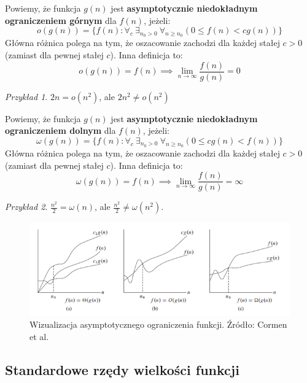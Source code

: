 \documentclass[10pt, oneside]{article}
\theoremstyle{remark}
\newtheorem*{example}{Przykład}
\begin{document}
Powiemy, że funkcja $g(n)$ jest \textbf{asymptotycznie niedokładnym ograniczeniem górnym} dla $f(n)$, jeżeli:
$$
o(g(n)) = \{ f(n): \forall_{c}\ \exists_{n_0>0}\ \forall_{n \geq n_0} \left(0 \leq f(n) < c g(n) \right) \}
$$
Główna różnica polega na tym, że oszacowanie zachodzi dla każdej stałej $c>0$ (zamiast dla pewnej stałej $c$).
Inna definicja to:
$$
o(g(n)) = f(n) \implies \lim_{n \to \infty} \frac{f(n)}{g(n)} = 0
$$

\begin{example}
$2n = o(n^2)$, ale $2n^2 \neq o(n^2)$
\end{example}

Powiemy, że funkcja $g(n)$ jest \textbf{asymptotycznie niedokładnym ograniczeniem dolnym} dla $f(n)$, jeżeli:
$$
\omega(g(n)) = \{ f(n): \forall_{c}\ \exists_{n_0>0}\ \forall_{n \geq n_0} \left(0 \leq c g(n) < f(n)  \right) \}
$$
Główna różnica polega na tym, że oszacowanie zachodzi dla każdej stałej $c>0$ (zamiast dla pewnej stałej $c$).
Inna definicja to:
$$
\omega(g(n)) = f(n) \implies \lim_{n \to \infty} \frac{f(n)}{g(n)} = \infty
$$

\begin{example}
$\frac{n^2}{2} = \omega(n)$, ale $\frac{n^2}{2} \neq \omega(n^2)$.
\end{example}


\begin{figure}
	\includegraphics{figures/big_o}
	\caption{Wizualizacja asymptotycznego ograniczenia funkcji. Źródło: Cormen et al.}
\end{figure}

\subsection{Standardowe rzędy wielkości funkcji}
\end{document}
